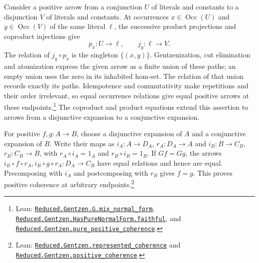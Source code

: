 \documentclass[11pt]{article}
\newcommand{\Occ}{\operatorname{Occ}}
\begin{document}
Consider a positive arrow from a conjunction $U$ of literals
and constants to a disjunction $V$ of literals and constants.
At occurrences $x\in\Occ(U)$ and $y\in\Occ(V)$ of the same
literal $\ell$, the successive product projections and coproduct
injections give
\[
 p_x:U\longrightarrow\ell,\qquad
 j_y:\ell\longrightarrow V.
\]
The relation of $j_y\circ p_x$ is the singleton $\{(x,y)\}$.
Gentzenization, cut elimination and atomization express the given
arrow as a finite union of these paths; an empty union uses the
zero in its inhabited hom-set. The relation of that union records
exactly its paths. Idempotence and commutativity make repetitions
and their order irrelevant, so equal occurrence relations give
equal positive arrows at these endpoints.\footnote{\raggedright Lean:
\href{https://github.com/flengyel/Dosen-Petric-Maximality/blob/5dbee39bea09539bd130f729e82636419f71f920/DosenPetric/GentzenMixNormalForm.lean\#L37}{\texttt{Reduced.Gentzen.G.\allowbreak{}mix\_normal\_form}},
\href{https://github.com/flengyel/Dosen-Petric-Maximality/blob/5dbee39bea09539bd130f729e82636419f71f920/DosenPetric/GentzenPureNormalForms.lean\#L84}{\texttt{Reduced.Gentzen.HasPureNormalForm.\allowbreak{}faithful}}, and
\href{https://github.com/flengyel/Dosen-Petric-Maximality/blob/5dbee39bea09539bd130f729e82636419f71f920/DosenPetric/GentzenPurePositiveCoherence.lean\#L14}{\texttt{Reduced.Gentzen.\allowbreak{}pure\_positive\_coherence}}.}
The coproduct and product equations extend this assertion to
arrows from a disjunctive expansion to a conjunctive expansion.

For positive $f,g:A\to B$, choose a disjunctive expansion of $A$
and a conjunctive expansion of $B$. Write their maps as
$i_A:A\to D_A$, $r_A:D_A\to A$ and
$i_B:B\to C_B$, $r_B:C_B\to B$, with
$r_A\circ i_A=1_A$ and $r_B\circ i_B=1_B$.
If $Gf=Gg$, the arrows
$i_B\circ f\circ r_A,i_B\circ g\circ r_A:D_A\to C_B$
have equal relations and hence are equal. Precomposing with
$i_A$ and postcomposing with $r_B$ gives $f=g$.
This proves positive coherence at arbitrary endpoints.\footnote{\raggedright Lean:
\href{https://github.com/flengyel/Dosen-Petric-Maximality/blob/5dbee39bea09539bd130f729e82636419f71f920/DosenPetric/GentzenPositiveCoherence.lean\#L14}{\texttt{Reduced.Gentzen.\allowbreak{}represented\_coherence}} and
\href{https://github.com/flengyel/Dosen-Petric-Maximality/blob/5dbee39bea09539bd130f729e82636419f71f920/DosenPetric/GentzenPositiveCoherence.lean\#L31}{\texttt{Reduced.Gentzen.\allowbreak{}positive\_coherence}}.}
\end{document}
